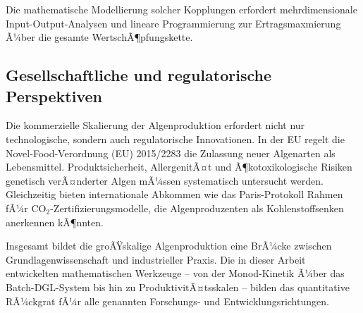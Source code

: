 ﻿\documentclass[a4paper,12pt]{article}
\theoremstyle{definition}
\begin{document}
Die mathematische Modellierung solcher Kopplungen erfordert mehrdimensionale
Input-Output-Analysen und lineare Programmierung zur Ertragsmaxmierung
Ã¼ber die gesamte WertschÃ¶pfungskette.

\subsection{Gesellschaftliche und regulatorische Perspektiven}

Die kommerzielle Skalierung der Algenproduktion erfordert nicht nur technologische,
sondern auch regulatorische Innovationen. In der EU regelt die Novel-Food-Verordnung
(EU) 2015/2283 die Zulassung neuer Algenarten als Lebensmittel. Produktsicherheit,
AllergenitÃ¤t und Ã¶kotoxikologische Risiken genetisch verÃ¤nderter Algen mÃ¼ssen
systematisch untersucht werden. Gleichzeitig bieten internationale Abkommen wie
das Paris-Protokoll Rahmen fÃ¼r CO$_2$-Zertifizierungsmodelle, die Algenproduzenten
als Kohlenstoffsenken anerkennen kÃ¶nnten.

Insgesamt bildet die groÃŸskalige Algenproduktion eine BrÃ¼cke zwischen
Grundlagenwissenschaft und industrieller Praxis. Die in dieser Arbeit entwickelten
mathematischen Werkzeuge -- von der Monod-Kinetik Ã¼ber das Batch-DGL-System bis hin
zu ProduktivitÃ¤tsskalen -- bilden das quantitative RÃ¼ckgrat fÃ¼r alle genannten
Forschungs- und Entwicklungsrichtungen.
\end{document}
